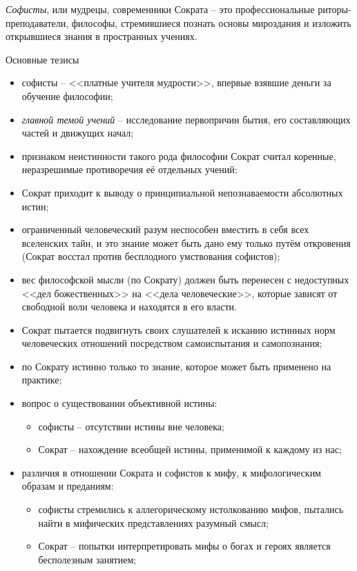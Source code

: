 
\emph{Софисты}, или мудрецы, современники Сократа -- это профессиональные риторы-преподаватели, философы, 
стремившиеся познать основы мироздания и изложить открывшиеся знания в пространных учениях. 

Основные тезисы
\begin{itemize}
    \item софисты -- <<платные учителя мудрости>>, впервые взявшие деньги за обучение философии;
    \item \emph{главной темой учений} -- исследование первопричин бытия, его составляющих частей и 
        движущих начал;
    \item признаком неистинности такого рода философии Сократ считал коренные, неразрешимые 
        противоречия её отдельных учений;
    \item Сократ приходит к выводу о принципиальной непознаваемости абсолютных истин;
    \item ограниченный человеческий разум неспособен вместить в себя всех вселенских тайн, и это знание 
        может быть дано ему только путём откровения (Сократ восстал против бесплодного умствования софистов);
    \item вес философской мысли (по Сократу) должен быть перенесен с недоступных <<дел божественных>> на 
        <<дела человеческие>>, которые зависят от свободной воли человека и находятся в его власти. 
    \item Сократ пытается подвигнуть своих слушателей к исканию истинных норм человеческих отношений 
        посредством самоиспытания и самопознания;
    \item по Сократу истинно только то знание, которое может быть применено на практике;
    \item вопрос о существовании объективной истины:
    \begin{itemize}
        \item софисты -- отсутствии истины вне человека;
        \item Сократ -- нахождение всеобщей истины, применимой к каждому из нас;
    \end{itemize}
    \item различия в отношении Сократа и софистов к мифу, к мифологическим образам и преданиям:
    \begin{itemize}
        \item софисты стремились к аллегорическому истолкованию мифов, пытались найти в мифических 
            представлениях разумный смысл;
        \item Сократ -- попытки интерпретировать мифы о богах и героях является бесполезным занятием;
    \end{itemize}
\end{itemize}